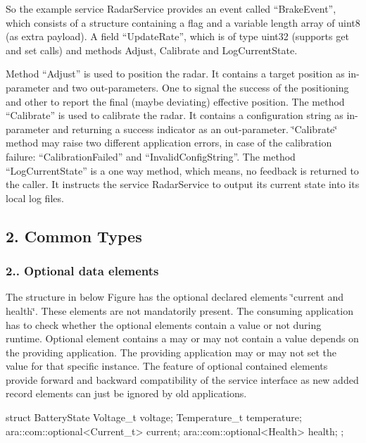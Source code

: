 \begin{DoxyItemize}
\item So the example service Radar\+Service provides an event called “\+Brake\+Event”, which consists of a structure containing a flag and a variable length array of uint8 (as extra payload). A field “\+Update\+Rate”, which is of type uint32 (supports get and set calls) and methods Adjust, Calibrate and Log\+Current\+State.
\item Method “\+Adjust” is used to position the radar. It contains a target position as in-\/parameter and two out-\/parameters. One to signal the success of the positioning and other to report the final (maybe deviating) effective position. The method “\+Calibrate” is used to calibrate the radar. It contains a configuration string as in-\/parameter and returning a success indicator as an out-\/parameter. \char`\"{}\+Calibrate\char`\"{} method may raise two different application errors, in case of the calibration failure\+: “\+Calibration\+Failed” and “\+Invalid\+Config\+String”. The method “\+Log\+Current\+State” is a one way method, which means, no feedback is returned to the caller. It instructs the service Radar\+Service to output its current state into its local log files.
\end{DoxyItemize}

\subsection*{2. Common Types}

\subsubsection*{2.. Optional data elements}


\begin{DoxyItemize}
\item The structure in below Figure has the optional declared elements \char`\"{}current and health\char`\"{}. These elements are not mandatorily present. The consuming application has to check whether the optional elements contain a value or not during runtime. Optional element contains a may or may not contain a value depends on the providing application. The providing application may or may not set the value for that specific instance. The feature of optional contained elements provide forward and backward compatibility of the service interface as new added record elements can just be ignored by old applications. \begin{DoxyVerb}struct BatteryState {
  Voltage_t voltage;
  Temperature_t temperature;
  ara::com::optional<Current_t> current;
  ara::com::optional<Health> health;
};
\end{DoxyVerb}

\end{DoxyItemize}

